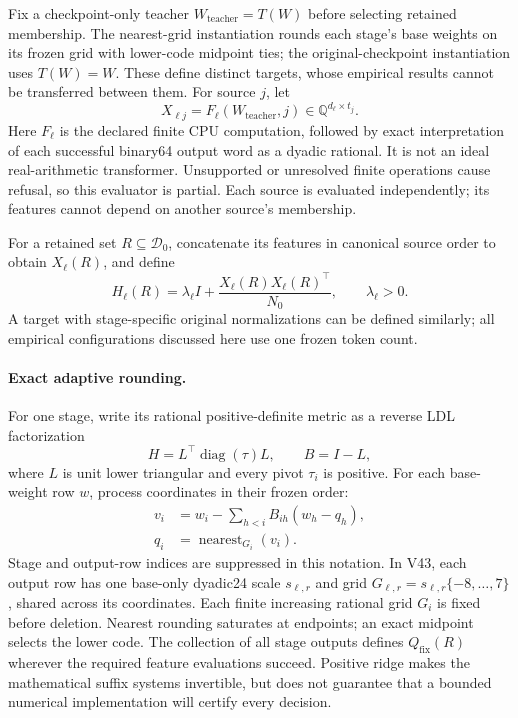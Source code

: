 \documentclass[10pt,twocolumn,letterpaper]{article}
\newcommand{\Q}{\mathbb{Q}}
\newcommand{\calD}{\mathcal{D}}
\newcommand{\Qfix}{Q_{\mathrm{fix}}}
\begin{document}
Fix a checkpoint-only teacher $W_{\mathrm{teacher}}=T(W)$ before selecting
retained membership. The nearest-grid instantiation rounds each stage's base
weights on its frozen grid with lower-code midpoint ties; the original-checkpoint
instantiation uses $T(W)=W$. These define distinct targets, whose empirical
results cannot be transferred between them. For source $j$, let
\[
 X_{\ell j}=F_\ell(W_{\mathrm{teacher}},j)
       \in\Q^{d_\ell\times t_j}.
\]
Here $F_\ell$ is the declared finite CPU computation, followed by exact
interpretation of each successful binary64 output word as a dyadic rational.
It is not an ideal real-arithmetic transformer. Unsupported or unresolved finite
operations cause refusal, so this evaluator is partial. Each source is evaluated
independently; its features cannot depend on another source's membership.

For a retained set $R\subseteq\calD_0$, concatenate its features in canonical
source order to obtain $X_\ell(R)$, and define
\begin{equation}
 H_\ell(R)=\lambda_\ell I+
   \frac{X_\ell(R)X_\ell(R)^\top}{N_0},
 \qquad \lambda_\ell>0.
 \label{eq:metric}
\end{equation}
A target with stage-specific original normalizations can be defined similarly;
all empirical configurations discussed here use one frozen token count.

\paragraph{Exact adaptive rounding.}
For one stage, write its rational positive-definite metric as a reverse LDL
factorization
\[
 H=L^\top\operatorname{diag}(\tau)L,
 \qquad B=I-L,
\]
where $L$ is unit lower triangular and every pivot $\tau_i$ is positive. For each
base-weight row $w$, process coordinates in their frozen order:
\begin{align}
 v_i&=w_i-\sum_{h<i} B_{ih}(w_h-q_h),\label{eq:recurrence}\\
 q_i&=\operatorname{nearest}_{G_i}(v_i).
 \label{eq:rounding}
\end{align}
Stage and output-row indices are suppressed in this notation. In V43, each
output row has one base-only dyadic24 scale $s_{\ell,r}$ and grid
$G_{\ell,r}=s_{\ell,r}\{-8,\ldots,7\}$, shared across its coordinates.
Each finite increasing rational grid $G_i$ is fixed before deletion. Nearest
rounding saturates at endpoints; an exact midpoint selects the lower code. The
collection of all stage outputs defines $\Qfix(R)$ wherever the required feature
evaluations succeed. Positive ridge makes the mathematical suffix systems
invertible, but does not guarantee that a bounded numerical implementation will
certify every decision.
\end{document}
